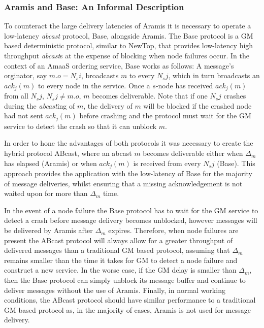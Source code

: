     \subsubsection*{\textsf{Aramis} and \textsf{Base}: An Informal Description}    
    To counteract the large delivery latencies of \textsf{Aramis} it is necessary to operate a low-latency \emph{abcast} protocol, \textsf{Base}, alongside \textsf{Aramis}.  The \textsf{Base} protocol is a GM based deterministic protocol, similar to NewTop\citep{Ezhilchelvan:1995:NFG:876885.880005}, that provides low-latency high throughput \emph{abcast}s at the expense of blocking when node failures occur.  In the context of an \textsf{AmaaS} ordering service, \textsf{Base} works as follows: A message's orginator, say $m.o = N_si$, broadcasts $m$ to every $N_sj$, which in turn broadcasts an $ack_j(m)$ to every node in the service.  Once a $s$-node has received $ack_j(m)$ from all $N_sj$, $N_sj \neq m.o$, $m$ becomes deliverable.  Note that if one $N_sj$ crashes during the \emph{abcast}ing of $m$, the delivery of $m$ will be blocked if the crashed node had not sent $ack_j(m)$ before crashing and the protocol must wait for the GM service to detect the crash so that it can unblock $m$.   
    
    In order to hone the advantages of both protocols it was necessary to create the hybrid protocol \textsf{ABcast}, where an \textsf{abcast} $m$ becomes deliverable either when $\Delta_m$ has elapsed (\textsf{Aramis}) or when $ack_j(m)$ is received from every $N_sj$ (\textsf{Base}).  This approach provides the application with the low-latency of \textsf{Base} for the majority of message deliveries, whilst ensuring that a missing acknowledgement is not waited upon for more than $\Delta_m$ time.  
    
    In the event of a node failure the \textsf{Base} protocol has to wait for the GM service to detect a crash before message delivery becomes unblocked, however messages will be delivered by \textsf{Aramis} after $\Delta_m$ expires.  Therefore, when node failures are present the \textsf{ABcast} protocol will always allow for a greater throughput of delivered messages than a traditional GM based protocol, assuming that $\Delta_m$ remains smaller than the time it takes for GM to detect a node failure and construct a new service.  In the worse case, if the GM delay is smaller than $\Delta_m$, then the \textsf{Base} protocol can simply unblock its message buffer and continue to deliver messages without the use of \textsf{Aramis}.  Finally, in normal working conditions, the \textsf{ABcast} protocol should have similar performance to a traditional GM based protocol as, in the majority of cases, \textsf{Aramis} is not used for message delivery.  

